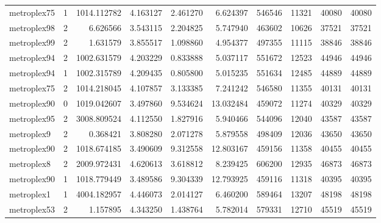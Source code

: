 \begin{longtable}{|l|r|r|r|r|r|r|r|r|r|}
metroplex75 & 1 & 1014.112782 & 4.163127 & 2.461270 & 6.624397 & 546546 & 11321 & 40080 & 40080 \\
metroplex98 & 2 & 6.626566 & 3.543115 & 2.204825 & 5.747940 & 463602 & 10626 & 37521 & 37521 \\
metroplex99 & 2 & 1.631579 & 3.855517 & 1.098860 & 4.954377 & 497355 & 11115 & 38846 & 38846 \\
metroplex94 & 2 & 1002.631579 & 4.203229 & 0.833888 & 5.037117 & 551672 & 12523 & 44946 & 44946 \\
metroplex94 & 1 & 1002.315789 & 4.209435 & 0.805800 & 5.015235 & 551634 & 12485 & 44889 & 44889 \\
metroplex75 & 2 & 1014.218045 & 4.107857 & 3.133385 & 7.241242 & 546580 & 11355 & 40131 & 40131 \\
metroplex90 & 0 & 1019.042607 & 3.497860 & 9.534624 & 13.032484 & 459072 & 11274 & 40329 & 40329 \\
metroplex95 & 2 & 3008.809524 & 4.112550 & 1.827916 & 5.940466 & 544096 & 12040 & 43587 & 43587 \\
metroplex9 & 2 & 0.368421 & 3.808280 & 2.071278 & 5.879558 & 498409 & 12036 & 43650 & 43650 \\
metroplex90 & 2 & 1018.674185 & 3.490609 & 9.312558 & 12.803167 & 459156 & 11358 & 40455 & 40455 \\
metroplex8 & 2 & 2009.972431 & 4.620613 & 3.618812 & 8.239425 & 606200 & 12935 & 46873 & 46873 \\
metroplex90 & 1 & 1018.779449 & 3.489586 & 9.304339 & 12.793925 & 459116 & 11318 & 40395 & 40395 \\
metroplex1 & 1 & 4004.182957 & 4.446073 & 2.014127 & 6.460200 & 589464 & 13207 & 48198 & 48198 \\
metroplex53 & 2 & 1.157895 & 4.343250 & 1.438764 & 5.782014 & 579331 & 12710 & 45519 & 45519 \\
\end{longtable}
